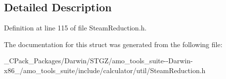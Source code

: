\subsection{Detailed Description}


Definition at line 115 of file Steam\+Reduction.\+h.



The documentation for this struct was generated from the following file\+:\begin{DoxyCompactItemize}
\item 
\+\_\+\+C\+Pack\+\_\+\+Packages/\+Darwin/\+S\+T\+G\+Z/amo\+\_\+tools\+\_\+suite-\/-\/\+Darwin-\/x86\+\_/amo\+\_\+tools\+\_\+suite/include/calculator/util/Steam\+Reduction.\+h\end{DoxyCompactItemize}

